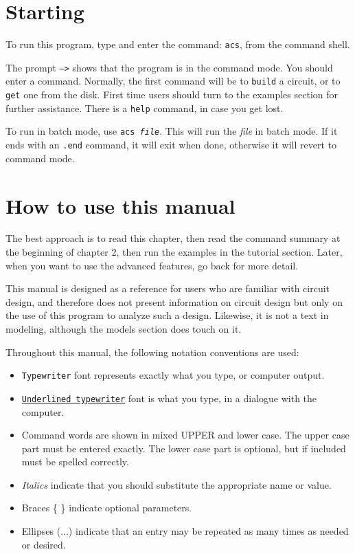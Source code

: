 \section{Starting}

To run this program, type and enter the command: {\tt acs}, from the command
shell.

The prompt {\tt -->} shows that the program is in the command mode.  You
should enter a command.  Normally, the first command will be to {\tt build} a
circuit, or to {\tt get} one from the disk.  First time users should turn to
the examples section for further assistance.  There is a {\tt help} command,
in case you get lost.

To run in batch mode, use {\tt acs {\em file}}.  This will run the {\em
file} in batch mode.  If it ends with an {\tt .end} command, it will exit
when done, otherwise it will revert to command mode.
\section{How to use this manual}

The best approach is to read this chapter, then read the command summary at
the beginning of chapter 2, then run the examples in the tutorial section.
Later, when you want to use the advanced features, go back for more detail.

This manual is designed as a reference for users who are familiar with
circuit design, and therefore does not present information on circuit design
but only on the use of this program to analyze such a design.  Likewise, it
is not a text in modeling, although the models section does touch on it.

Throughout this manual, the following notation conventions are used:

\begin{itemize}
\item {\tt Typewriter} font represents exactly what you type, or computer
output.

\item {\tt \underline{Underlined typewriter}} font is what you type, in a
dialogue with the computer.

\item Command words are shown in mixed UPPER and lower case.  The upper case
part must be entered exactly.  The lower case part is optional, but if
included must be spelled correctly.

\item {\it Italics} indicate that you should substitute the appropriate name
or value.

\item Braces  \{ \}  indicate optional parameters.

\item Ellipses (...) indicate that an entry may be repeated as many times as
needed or desired.

\end{itemize}
